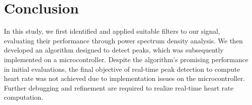 
\section{Conclusion}
In this study, we first identified and applied suitable filters to our signal, evaluating their performance through power spectrum density analysis. We then developed an algorithm designed to detect peaks, which was subsequently implemented on a microcontroller. Despite the algorithm's promising performance in initial evaluations, the final objective of real-time peak detection to compute heart rate was not achieved due to implementation issues on the microcontroller. Further debugging and refinement are required to realize real-time heart rate computation.
 
